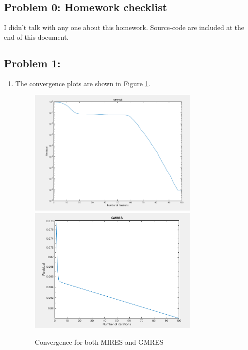 \documentclass{article}
\begin{document}
 



\hypertarget{problem_0_homework_checklist_2}{}
\subsection*{{Problem 0: Homework checklist}}
\label{}

\checkmark	I didn't talk with any one about this homework. \newline
\checkmark 	Source-code are included at the end of this document. 

\hypertarget{}{}
\subsection*{{Problem 1: }}
\label{}


\begin{enumerate} 
\item 

The convergence plots are shown in Figure \ref{fig:problem1_1}.  

\begin{figure}[h!]
\includegraphics[width=0.8\textwidth]{MIRES} 
\includegraphics[width=0.8\textwidth]{GMRES} 
\label{fig:problem1_1}
\center
\caption{Convergence for both MIRES and GMRES} 
\end{figure}


\end{enumerate}
\end{document}

